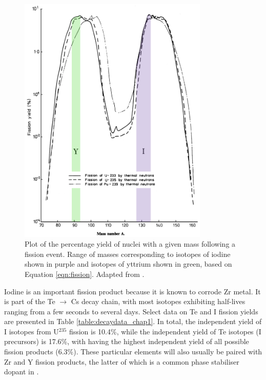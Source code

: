 \begin{figure}[ht!]
\centering
\includegraphics[height=12cm]{images/fissionyield.jpg}
\caption[Plot of the percentage yield of nuclei with a given mass following a fission event. Range of masses corresponding to isotopes of iodine shown in purple and isotopes of yttrium shown in green, based on Equation \ref{eqn:fission}.]{Plot of the percentage yield of nuclei with a given mass following a fission event. Range of masses corresponding to isotopes of iodine shown in purple and isotopes of yttrium shown in green, based on Equation \ref{eqn:fission}. Adapted from \cite{England1992}.}
\label{figure:fissionyield}
\end{figure}

Iodine is an important fission product because it is known to corrode Zr metal. It is part of the Te $\rightarrow$ Cs decay chain, with most isotopes exhibiting half-lives ranging from a few seconds to several days. Select data on Te and I fission yields are presented in Table \ref{table:decaydata_chap1}. In total, the independent yield of I isotopes from U$^{235}$ fission is 10.4\%, while the independent yield of Te isotopes (I precursors) is 17.6\%, with  having the highest independent yield of all possible fission products (6.3\%). These particular elements will also usually be paired with Zr and Y fission products, the latter of which is a common phase stabiliser dopant in \zirconia .

